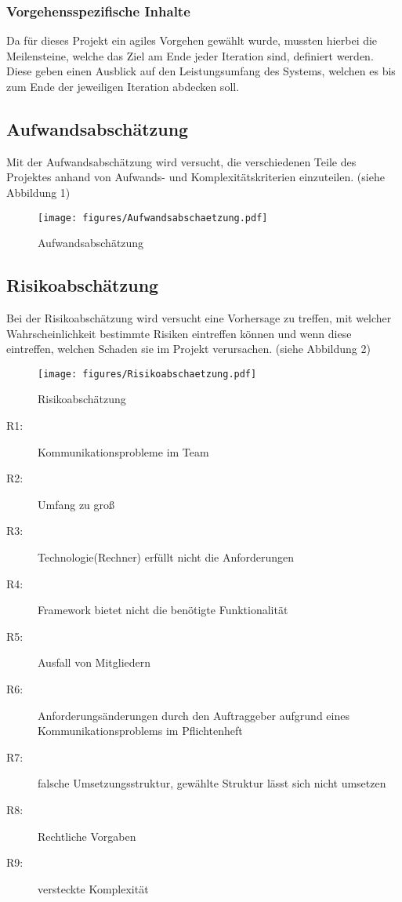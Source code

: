 \documentclass[a4paper, 11pt, ngerman, fleqn]{article}
\begin{document}
\subsubsection{Vorgehensspezifische Inhalte}
Da für dieses Projekt ein agiles Vorgehen gewählt wurde, mussten hierbei die Meilensteine, welche das Ziel am Ende jeder Iteration sind, definiert werden.
Diese geben einen Ausblick auf den Leistungsumfang des Systems, welchen es bis zum Ende der jeweiligen Iteration abdecken soll.

\subsection{Aufwandsabschätzung}
Mit der Aufwandsabschätzung wird versucht, die verschiedenen Teile des Projektes anhand von Aufwands- und Komplexitätskriterien einzuteilen. (siehe Abbildung 1)
\clearpage
	\begin{figure}
		\begin{center}
			\texttt{[image: figures/Aufwandsabschaetzung.pdf]}
			\caption{Aufwandsabschätzung}
		\end{center}
	\end{figure}

\subsection{Risikoabschätzung}
Bei der Risikoabschätzung wird versucht eine Vorhersage zu treffen, mit welcher Wahrscheinlichkeit bestimmte Risiken eintreffen können und wenn diese eintreffen, welchen Schaden sie im Projekt verursachen. (siehe Abbildung 2)

\begin{figure}
\begin{center}
	\texttt{[image: figures/Risikoabschaetzung.pdf]}
	\caption{Risikoabschätzung}
	\end{center}
	\end{figure}
	

\begin{description}
		\item[R1:] Kommunikationsprobleme im Team
		\item[R2:] Umfang zu groß
		\item[R3:] Technologie(Rechner) erfüllt nicht die Anforderungen
		\item[R4:] Framework bietet nicht die benötigte Funktionalität
		\item[R5:] Ausfall von Mitgliedern 
		\item[R6:] Anforderungsänderungen durch den Auftraggeber aufgrund eines Kommunikationsproblems im Pflichtenheft
		\item[R7:] falsche Umsetzungsstruktur, gewählte Struktur lässt sich nicht umsetzen
		\item[R8:] Rechtliche Vorgaben
		\item[R9:] versteckte Komplexität
	\end{description}
	
\end{document}
